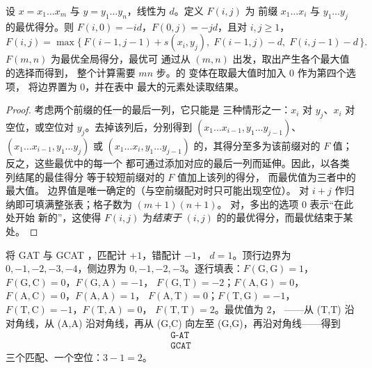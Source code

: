 \begin{theorem}[尼德曼–翁施]\label{thm:b3:bioinformatics:nw}
设 $x = x_{1}\dots x_{m}$ 与 $y = y_{1}\dots y_{n}$，线性为
$d$。定义 $F(i,j)$ 为
前缀 $x_{1}\dots x_{i}$ 与 $y_{1}\dots y_{j}$ 的最优得分。则
$F(i,0) = -id$，$F(0,j) = -jd$，且对 $i,j \ge 1$，
\[
F(i,j) = \max\bigl\{\,F(i-1,j-1) + s(x_{i},y_{j}),\;
F(i-1,j) - d,\; F(i,j-1) - d\,\bigr\}.
\]
$F(m,n)$ 为最优全局得分，最优可
通过从 $(m,n)$ 出发，取出产生各个最大值的选择而得到，
整个计算需要 $mn$ 步。的
\emph{}变体在取最大值时加入 $0$ 作为第四个选项，
将边界置为 $0$，并在表中
最大的元素处读取结果。
\end{theorem}
\begin{proof}
考虑两个前缀的任一的最后一列，它只能是
三种情形之一：$x_{i}$ 对 $y_{j}$、$x_{i}$ 对空位，或空位对
$y_{j}$。去掉该列后，分别得到 $(x_{1}\dots x_{i-1},
y_{1}\dots y_{j-1})$、$(x_{1}\dots x_{i-1}, y_{1}\dots y_{j})$ 或
$(x_{1}\dots x_{i}, y_{1}\dots y_{j-1})$ 的，其得分至多为该前缀对的
$F$ 值；反之，这些最优中的每一个
都可通过添加对应的最后一列而延伸。因此，以各类列结尾的最佳得分
等于较短前缀对的 $F$ 值加上该列的得分，
而最优值为三者中的最大值。
边界值是唯一确定的（与空前缀配对时只可能出现空位）。
对 $i + j$ 作归纳即可填满整张表；格子数为 $(m+1)(n+1)$。
对，多出的选项 $0$ 表示“在此处开始
新的”，这使得 $F(i,j)$ 为\emph{结束于}
$(i,j)$ 的的最优得分，而最优结束于某处。
\end{proof}

\begin{example}[一张四乘三的表]\label{ex:b3:bioinformatics:nw-example}
将 GAT 与 GCAT ，匹配计 $+1$，错配计 $-1$，
$d = 1$。顶行边界为 $0, -1, -2, -3, -4$，侧边界为 $0, -1,
-2, -3$。逐行填表：$F(\text{G},\text{G}) = 1$，
$F(\text{G},\text{C}) = 0$，$F(\text{G},\text{A}) = -1$，
$F(\text{G},\text{T}) = -2$；$F(\text{A},\text{G}) = 0$，
$F(\text{A},\text{C}) = 0$，$F(\text{A},\text{A}) = 1$，
$F(\text{A},\text{T}) = 0$；$F(\text{T},\text{G}) = -1$，
$F(\text{T},\text{C}) = -1$，$F(\text{T},\text{A}) = 0$，
$F(\text{T},\text{T}) = 2$。最优值为 $2$，
——从 (T,T) 沿对角线，从 (A,A) 沿对角线，再从 (G,C) 向左至
(G,G)，再沿对角线——得到
\[
\begin{array}{c}
\texttt{G-AT}\\
\texttt{GCAT}
\end{array}
\]
三个匹配、一个空位：$3 - 1 = 2$。
\end{example}

